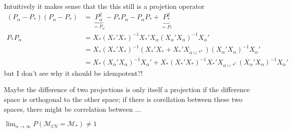 \documentclass[Research_Module_ES.tex]{subfiles}
\begin{document}
Intuitively it makes sense that the this still is a projetion operator
\begin{align*}
(P_\alpha-P_\ast) (P_\alpha-P_\ast) &= \underbrace{P_\alpha^2}_{=P_\alpha} -P_\ast P_\alpha - P_\alpha P_\ast + \underbrace{P_\ast^2}_{=P_\ast}\\
P_\ast P_\alpha &= X_\ast (X_\ast'X_\ast)^{-1} X_\ast'X_\alpha(X_\alpha'X_\alpha)^{-1}X_\alpha'\\
&= X_\ast (X_\ast'X_\ast)^{-1} ( X_\ast' X_\ast +  X_\ast'X_{\alpha \cup \ast^c})(X_\alpha'X_\alpha)^{-1}X_\alpha'\\
&= X_\ast (X_\alpha'X_\alpha)^{-1}X_\alpha' + X_\ast (X_\ast'X_\ast)^{-1} X_\ast'X_{\alpha \cup \ast^c}(X_\alpha'X_\alpha)^{-1}X_\alpha'
\end{align*}
but I don't see why it should be idempotent?!

Maybe the difference of two projections is only itself a projection if the difference space is orthogonal to the other space; 
if there is corellation between these two spaces, there might be correlation between ...

$\lim_{n\to\infty}P(\mathcal{M}_{CV}=\mathcal{M}_\ast) \neq 1$
\end{document}
